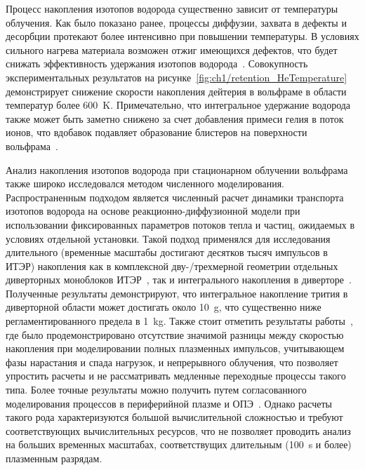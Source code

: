 Процесс накопления изотопов водорода существенно зависит от температуры облучения. Как было показано ранее, процессы диффузии, захвата в дефекты и десорбции протекают более интенсивно при повышении температуры. В условиях сильного нагрева материала возможен отжиг имеющихся дефектов, что будет снижать эффективность удержания изотопов водорода~\cite{Dark2024}. Совокупность экспериментальных результатов на рисунке~\cref{fig:ch1/retention_HeTemperature} демонстрирует снижение скорости накопления дейтерия в вольфраме в области температур более \SI{600}{\kelvin}. Примечательно, что интегральное удержание водорода также может быть заметно снижено за счет добавления примеси гелия в поток ионов, что вдобавок подавляет образование блистеров на поверхности вольфрама~\cite{Baldwin2011}. 

Анализ накопления изотопов водорода при стационарном облучении вольфрама также широко исследовался методом численного моделирования. Распространенным подходом является численный расчет динамики транспорта изотопов водорода на основе реакционно-диффузионной модели при использовании фиксированных параметров потоков тепла и частиц, ожидаемых в условиях отдельной установки. Такой подход применялся для исследования длительного (временные масштабы достигают десятков тысяч импульсов в ИТЭР) накопления как в комплексной дву-/трехмерной геометрии отдельных диверторных моноблоков ИТЭР~\cite{Delaporte-Mathurin2019,Hodille2021_2,Delaporte-Mathurin2021}, так и интегрального накопления в диверторе~\cite{Delaporte-Mathurin2020, Delaporte-Mathurin2021_2}. Полученные результаты демонстрируют, что интегральное накопление трития в диверторной области может достигать около \SI{10}{\gram}, что существенно ниже регламентированного предела в \SI{1}{\kilogram}. Также стоит отметить результаты работы~\cite{Hodille2021_2}, где было продемонстрировано отсутствие значимой разницы между скоростью накопления при моделировании полных плазменных импульсов, учитывающем фазы нарастания и спада нагрузок, и непрерывного облучения, что позволяет упростить расчеты и не рассматривать медленные переходные процессы такого типа. Более точные результаты можно получить путем согласованного моделирования процессов в периферийной плазме и ОПЭ~\cite{Smirnov2020,Lasa2024,Smirnov2024}. Однако расчеты такого рода характеризуются большой вычислительной сложностью и требуют соответствующих вычислительных ресурсов, что не позволяет проводить анализ на больших временных масштабах, соответствущих длительным (\SI{100}{\second} и более) плазменным разрядам.

